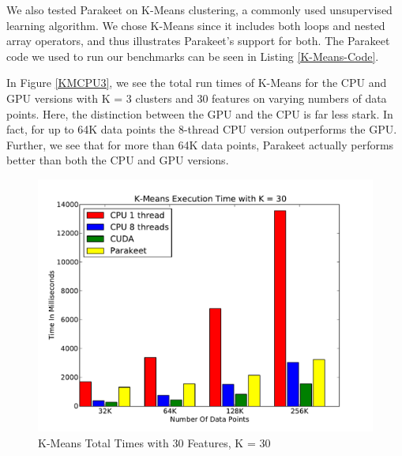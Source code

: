 \documentclass[10pt,twocolumn]{article}
\begin{document}
We also tested Parakeet on K-Means clustering, a commonly used unsupervised learning algorithm.  We chose K-Means since it includes both loops and nested array operators, and thus illustrates Parakeet's support for both.  The Parakeet code we used to run our benchmarks can be seen in Listing \ref{K-Means-Code}.

In Figure \ref{KMCPU3}, we see the total run times of K-Means for the CPU and GPU versions with K = 3 clusters and 30 features on varying numbers of data points.  Here, the distinction between the GPU and the CPU is far less stark.  In fact, for up to 64K data points the 8-thread CPU version outperforms the GPU.  Further, we see that for more than 64K data points, Parakeet actually performs better than both the CPU and GPU versions.

\begin{figure}[h!]
\includegraphics[scale=0.4]{KMCPUK30.pdf}
\caption{K-Means Total Times with 30 Features, K = 30}
\label{KMCPU30}
\end{figure}
\end{document}
